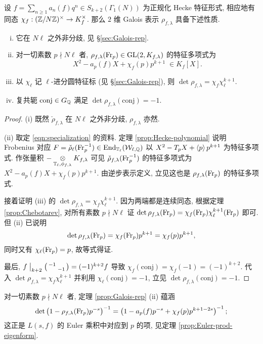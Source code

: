 \begin{theorem}\label{prop:Galois-rep}
	设 $f = \sum_{n \geq 1} a_n(f) q^n \in S_{k+2}(\Gamma_1(N))$ 为正规化 Hecke 特征形式, 相应地有同态 $\chi_f: (\mathbb{Z}/N\mathbb{Z})^\times \to K_f^\times$. 那么 $2$ 维 Galois 表示 $\rho_{f, \lambda}$ 具备下述性质.
	\begin{enumerate}[(i)]
		\item 它在 $N\ell$ 之外非分歧, 见 \S\ref{sec:Galois-rep}.
		\item 对一切素数 $p \nmid N\ell$ 者, $\rho_{f, \lambda}(\operatorname{Fr}_p) \in \operatorname{GL}(2, K_{f, \lambda})$ 的特征多项式为
		\[ X^2 - a_p(f) X + \chi_f(p) p^{k+1} \; \in K_f[X]. \]
		\item 以 $\chi_\ell$ 记 $\ell$-进分圆特征标 (见 \S\ref{sec:Galois-rep}), 则 $\det \rho_{f, \lambda} = \chi_f \chi_\ell^{k+1}$.
		\item 复共轭 $\mathrm{conj} \in G_{\mathbb{Q}}$ 满足 $\det \rho_{f, \lambda}(\mathrm{conj}) = -1$.
	\end{enumerate}
\end{theorem}
\begin{proof}
	(i) 既然 $\check{\rho}_{f, \lambda}$ 在 $N\ell$ 之外非分歧, $\rho_{f, \lambda}$ 亦然. 
	
	(ii) 取定 \eqref{eqn:specialization} 的资料. 定理 \ref{prop:Hecke-polynomial} 说明 Frobenius 对应 $F = \check{\rho}_\ell(\operatorname{Fr}_p^{-1}) \in \operatorname{End}_{\mathbb{T}_\ell}(\mathcal{W}_{\ell, \mathbb{Q}})$ 以 $X^2 - T_p X + \left\langle p \right\rangle p^{k+1}$ 为特征多项式. 作张量积 $- \underset{\mathbb{T}_\ell, \phi_{f, \lambda}}{\otimes} K_{f, \lambda}$ 可见 $\check{\rho}_{f, \lambda}(\operatorname{Fr}_p^{-1})$ 的特征多项式为 $X^2 - a_p(f) X + \chi_f(p) p^{k+1}$. 由逆步表示定义, 立见这也是 $\rho_{f, \lambda}(\operatorname{Fr}_p)$ 的特征多项式.
	
	接着证明 (iii) 的 $\det \rho_{f, \lambda} = \chi_f \chi_\ell^{k+1}$. 因为两端都是连续同态, 根据定理 \ref{prop:Chebotarev}, 对所有素数 $p \nmid N\ell$ 证 $\det \rho_{f, \lambda}(\operatorname{Fr}_p) = \chi_f(\operatorname{Fr}_p) \chi_\ell^{k+1}(\operatorname{Fr}_p)$ 即可. 但 (ii) 已说明
	\[ \det \rho_{f, \lambda}(\operatorname{Fr}_p) = \chi_f(\operatorname{Fr}_p) p^{k+1} = \chi_f(p) p^{k+1}, \]
	同时又有 $\chi_\ell(\operatorname{Fr}_p) = p$, 故等式得证.
	
	最后, $f \;\big|_{k+2} \; \bigl(\begin{smallmatrix} -1 &  \\  & -1 \end{smallmatrix}\bigr) = (-1)^{k+2} f$ 导致 $\chi_f(\text{conj}) = \chi_f(-1) = (-1)^{k+2}$. 代入 $\det \rho_{f, \lambda} = \chi_f \chi_\ell^{k+1}$ 并利用 $\chi_\ell(\text{conj}) = -1$, 立见 $\det \rho_{f, \lambda}(\mathrm{conj}) = -1$.
\end{proof}

\begin{remark}
	对一切素数 $p \nmid N\ell$ 者, 定理 \ref{prop:Galois-rep} (ii) 蕴涵
	\[ \det\left( 1 - \rho_{f, \lambda}(\operatorname{Fr}_p) p^{-s} \right)^{-1} = \left( 1 - a_p(f) p^{-s} + \chi_f(p) p^{k+1-2s} \right)^{-1} ; \]
	这正是 $L(s, f)$ 的 Euler 乘积中对应到 $p$ 的项, 见定理 \ref{prop:Euler-prod-eigenform}.
\end{remark}

